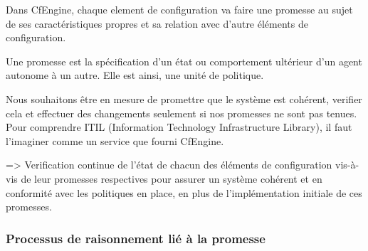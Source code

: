 Dans CfEngine, chaque element de configuration va faire une promesse au sujet de
ses caractéristiques propres et sa relation avec d'autre éléments de
configuration.

Une promesse est la spécification d'un état ou comportement ultérieur d'un agent
autonome à un autre. Elle est ainsi, une unité de politique.

Nous souhaitons être en mesure de promettre que le système est cohérent, verifier
cela et effectuer des changements seulement si nos promesses ne sont pas
tenues. Pour comprendre ITIL (Information Technology Infrastructure Library), il
faut l'imaginer comme un service que fourni CfEngine.

=> Verification continue de l'état de chacun des éléments de configuration
vis-à-vis de leur promesses respectives pour assurer un système cohérent et en
conformité avec les politiques en place, en plus de l'implémentation initiale de
ces promesses.

\subsubsection{Processus de raisonnement lié à la promesse}

